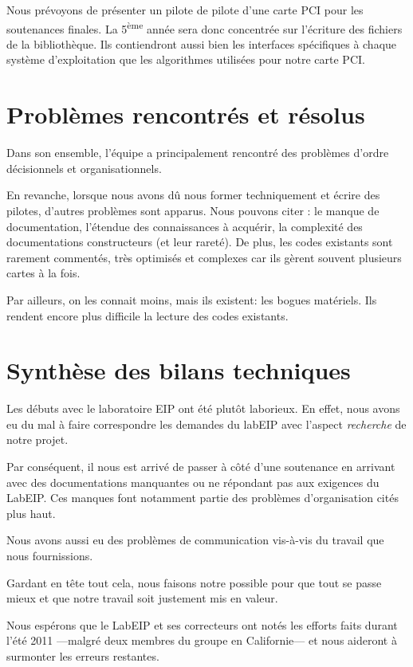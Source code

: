 \documentclass[francais]{rtxreport}
\begin{document}
Nous prévoyons de présenter un pilote de pilote d’une carte PCI pour les
soutenances finales. La 5\textsuperscript{ème} année sera donc concentrée sur
l'écriture des fichiers de la bibliothèque. Ils contiendront aussi bien les
interfaces spécifiques à chaque système d'exploitation que les algorithmes
utilisées pour notre carte PCI.

\section{Problèmes rencontrés et résolus}

Dans son ensemble, l'équipe a principalement rencontré des problèmes d'ordre
décisionnels et organisationnels.

En revanche, lorsque nous avons dû nous former techniquement et écrire des
pilotes, d'autres problèmes sont apparus. Nous pouvons citer : le manque de
documentation, l’étendue des connaissances à acquérir, la complexité des
documentations constructeurs (et leur rareté). De plus, les codes existants sont
rarement commentés, très optimisés et complexes car ils gèrent souvent
plusieurs cartes à la fois.

Par ailleurs, on les connait moins, mais ils existent: les bogues matériels.
Ils rendent encore plus difficile la lecture des codes existants.

\section{Synthèse des bilans techniques}

Les débuts avec le laboratoire EIP ont été plutôt laborieux. En effet, nous
avons eu du mal à faire correspondre les demandes du labEIP avec l'aspect
\emph{recherche} de notre projet.

Par conséquent, il nous est arrivé de passer à côté d’une soutenance en arrivant
avec des documentations manquantes ou ne répondant pas aux exigences du LabEIP.
Ces manques font notamment partie des problèmes d'organisation cités plus haut.

Nous avons aussi eu des problèmes de communication vis-à-vis du travail que nous
fournissions.

Gardant en tête tout cela, nous faisons notre possible pour que tout se passe
mieux et que notre travail soit justement mis en valeur.

Nous espérons que le LabEIP et ses correcteurs ont notés les efforts faits
durant l'été 2011 ---malgré deux membres du groupe en Californie--- et nous
aideront à surmonter les erreurs restantes.
\end{document}
